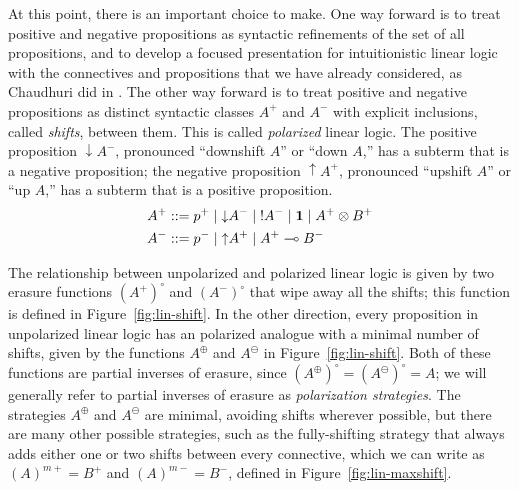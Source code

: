 At this point, there is an important choice to make. One way forward
is to treat positive and negative propositions as syntactic
refinements of the set of all propositions, and to develop a focused
presentation for intuitionistic linear logic with the connectives and
propositions that we have already considered, as Chaudhuri did in
\cite{chaudhuri06focused}.  The other way forward is to treat positive
and negative propositions as distinct syntactic classes $A^+$ and
$A^-$ with explicit inclusions, called {\it shifts}, between them.
This is called {\it polarized} linear logic.  The positive proposition
${\downarrow}A^-$, pronounced ``downshift $A$'' or ``down $A$,'' has a
subterm that is a negative proposition; the negative proposition
${\uparrow}A^+$, pronounced ``upshift $A$'' or ``up $A$,'' has a
subterm that is a positive proposition.
\begin{align*}
A^+ & ::= p^+ \mid {\downarrow}A^- \mid {!}A^- \mid \mathbf{1} \mid A^+ \otimes B^+\\
A^- & ::= p^- \mid {\uparrow}A^+ \mid A^+ \multimap B^-
\end{align*}



The relationship between unpolarized and polarized linear logic is
given by two erasure functions $(A^+)^\circ$ and $(A^-)^\circ$ that
wipe away all the shifts; this function is defined in
Figure~\ref{fig:lin-shift}. In the other direction, every proposition
in unpolarized linear logic has an polarized analogue with a minimal
number of shifts, given by the functions $A^\oplus$ and $A^\ominus$
in Figure~\ref{fig:lin-shift}.  Both of these functions are partial
inverses of erasure, since $(A^\oplus)^\circ = (A^\ominus)^\circ = A$;
we will generally refer to partial inverses of erasure as {\it
  polarization strategies}. The strategies $A^\oplus$ and $A^\ominus$
are minimal, avoiding shifts wherever possible, but there are many
other possible strategies, such as the fully-shifting strategy that
always adds either one or two shifts between every connective, which
we can write as $(A)^{m+} = B^+$ and $(A)^{m-} = B^-$, defined in
Figure~\ref{fig:lin-maxshift}.

